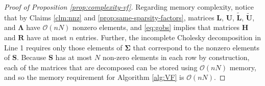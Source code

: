 \documentclass[12pt,letterpaper]{article}
\theoremstyle{propstyle}
\theoremstyle{propstyle}
\theoremstyle{propstyle}
\theoremstyle{propstyle}
\theoremstyle{propstyle}
\newcommand{\bS}{\mathbf{S}}
\newcommand{\bL}{\mathbf{L}}
\newcommand{\bH}{\mathbf{H}}
\newcommand{\bU}{\mathbf{U}}
\newcommand{\bR}{\mathbf{R}}
\newcommand{\bfSigma}{\bm{\Sigma}}
\newcommand{\bfLambda}{\bm{\Lambda}}
\newcommand{\order}{\mathcal{O}}
\begin{document}
\begin{proof}[Proof of Proposition \ref{prop:complexity-vf}]
    Regarding memory complexity, notice that by Claims \ref{clm:nnz} and \ref{prop:same-sparsity-factors}, matrices $\bL$, $\bU$, $\widetilde{\bL}$, $\widetilde{\bU}$, and $\bfLambda$ have $\order(nN)$ nonzero elements, and \eqref{eq:gobs} implies that matrices $\bH$ and $\bR$ have at most $n$ entries. Further, the incomplete Cholesky decomposition in Line 1 requires only those elements of $\bfSigma$ that correspond to the nonzero elements of $\bS$. Because $\bS$ has at most $N$ non-zero elements in each row by construction, each of the matrices that are decomposed can be stored using $\mathcal{O}(nN)$ memory, and so the memory requirement for Algorithm \ref{alg:VF} is $\mathcal{O}(nN)$.
\end{proof}









\end{document}
